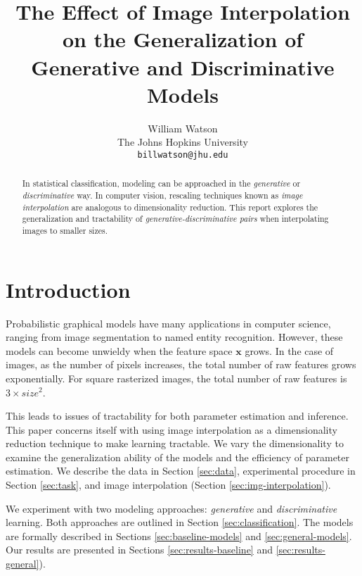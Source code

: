 \documentclass{article}
\title{The Effect of Image Interpolation on the Generalization of Generative and Discriminative Models}
\author{%
  William Watson \\
  The Johns Hopkins University\\
  \texttt{billwatson@jhu.edu} \\
}
\begin{document}

\maketitle

\begin{abstract}
  In statistical classification, modeling can be approached in the \textit{generative}
  or \textit{discriminative} way. In computer vision, rescaling
  techniques known as \textit{image interpolation} are analogous to
  dimensionality reduction. This report explores the generalization and tractability of
  \textit{generative-discriminative pairs} when interpolating images to smaller
  sizes.
\end{abstract}



\section{Introduction}
\label{sec:intro}
Probabilistic graphical models have many applications in computer science,
ranging from image segmentation to named entity recognition. However, these
models can become unwieldy when the feature space $\mathbf{x}$ grows. In the
case of images, as the number of pixels increases, the
total number of raw features grows exponentially. For square rasterized images,
the total number of raw features is $3 \times size^2$.

This leads to issues of tractability for both parameter estimation and
inference. This paper concerns itself with using image interpolation as
a dimensionality reduction technique to make learning tractable. We vary the
dimensionality to examine the generalization ability of the models and the
efficiency of parameter estimation. We describe the data in Section \ref{sec:data},
experimental procedure in Section \ref{sec:task}, and image interpolation
(Section \ref{sec:img-interpolation}).

We experiment with two modeling approaches: \textit{generative}
and \textit{discriminative} learning. Both approaches are outlined in Section
\ref{sec:classification}. The models are formally described in Sections
\ref{sec:baseline-models} and \ref{sec:general-models}. Our results
are presented in Sections \ref{sec:results-baseline} and \ref{sec:results-general}).
\end{document}
